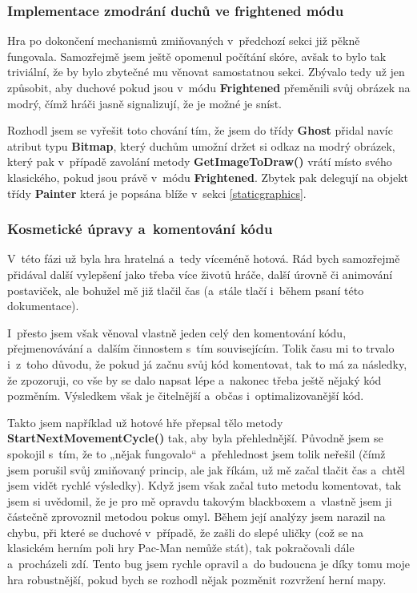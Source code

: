\documentclass[a4]{article}
\begin{document}
\subsubsection{Implementace zmodrání duchů ve frightened módu} \label{frightenedmode}
Hra po dokončení mechanismů zmiňovaných v~předchozí sekci již pěkně fungovala. Samozřejmě jsem ještě opomenul počítání skóre, avšak to bylo tak triviální, že by bylo zbytečné mu věnovat samostatnou sekci. Zbývalo tedy už jen způsobit, aby duchové pokud jsou v~módu \textbf{Frightened} přeměnili svůj obrázek na modrý, čímž hráči jasně signalizují, že je možné je sníst. 

Rozhodl jsem se vyřešit toto chování tím, že jsem do třídy \textbf{Ghost} přidal navíc atribut typu \textbf{Bitmap}, který duchům umožní držet si odkaz na modrý obrázek, který pak v~případě zavolání metody \textbf{GetImageToDraw()} vrátí místo svého klasického, pokud jsou právě v~módu \textbf{Frightened}. Zbytek pak delegují na objekt třídy \textbf{Painter} která je popsána blíže v~sekci \ref{staticgraphics}.

\subsubsection{Kosmetické úpravy a~komentování kódu}
V~této fázi už byla hra hratelná a~tedy víceméně hotová. Rád bych samozřejmě přidával další vylepšení jako třeba více životů hráče, další úrovně či animování postaviček, ale bohužel mě již tlačil čas (a~stále tlačí i~během psaní této dokumentace). 

I~přesto jsem však věnoval vlastně jeden celý den komentování kódu, přejmenovávání a~dalším činnostem s~tím souvisejícím. Tolik času mi to trvalo i~z~toho důvodu, že pokud já začnu svůj kód komentovat, tak to má za následky, že zpozoruji, co vše by se dalo napsat lépe a~nakonec třeba ještě nějaký kód pozměním. Výsledkem však je čitelnější a~občas i~optimalizovanější kód. 

Takto jsem například už hotové hře přepsal tělo metody \textbf{StartNextMovementCycle()} tak, aby byla přehlednější. Původně jsem se spokojil s~tím, že to „nějak fungovalo“ a~přehlednost jsem tolik neřešil (čímž jsem porušil svůj zmiňovaný princip, ale jak říkám, už mě začal tlačit čas a~chtěl jsem vidět rychlé výsledky). Když jsem však začal tuto metodu komentovat, tak jsem si uvědomil, že je pro mě opravdu takovým blackboxem a~vlastně jsem ji částečně zprovoznil metodou pokus omyl. Během její analýzy jsem narazil na chybu, při které se duchové v~případě, že zašli do slepé uličky (což se na klasickém herním poli hry Pac-Man nemůže stát), tak pokračovali dále a~procházeli zdí. Tento bug jsem rychle opravil a~do budoucna je díky tomu moje hra robustnější, pokud bych se rozhodl nějak pozměnit rozvržení herní mapy.
\end{document}

